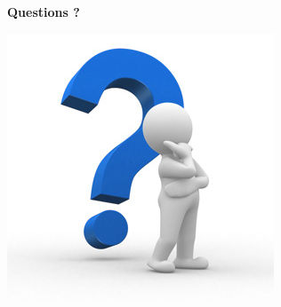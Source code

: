 \begin{frame}[t,fragile]{\textbf{Questions ?}}
\begin{center}
\includegraphics[height=.8\textheight,keepaspectratio]{UlbLogos/Questions.jpg}
\end{center}
\end{frame}




